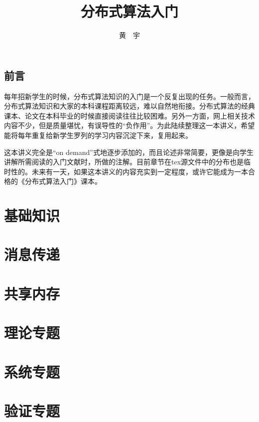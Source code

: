 \documentclass[UTF8]{ctexrep}
\begin{document}
\title{\Huge \bf 分布式算法入门}

\author{黄\ \ 宇}

\maketitle

\tableofcontents

\chapter*{前言}

每年招新学生的时候，分布式算法知识的入门是一个反复出现的任务。一般而言，分布式算法知识和大家的本科课程距离较远，难以自然地衔接。分布式算法的经典课本、论文在本科毕业的时候直接阅读往往比较困难。另外一方面，网上相关技术内容不少，但是质量堪忧，有误导性的“负作用”。为此陆续整理这一本讲义，希望能将每年重复给新学生罗列的学习内容沉淀下来，复用起来。

这本讲义完全是“on demand”式地逐步添加的，而且论述非常简要，更像是向学生讲解所需阅读的入门文献时，所做的注解。目前章节在tex源文件中的分布也是临时性的。未来有一天，如果这本讲义的内容充实到一定程度，或许它能成为一本合格的《分布式算法入门》课本。

\part{基础知识}

 


\part{消息传递}

 

 

\part{共享内存}

 

\part{理论专题}

 


\part{系统专题}

 

 

\part{验证专题}

 

 






\end{document}

